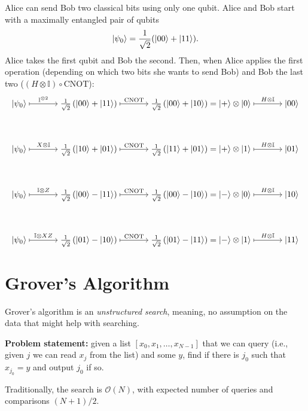 \documentclass[12pt]{amsart}
\theoremstyle{plain}
\theoremstyle{definition}
\theoremstyle{remark}
\newcommand{\mcal}{\mathcal}
\newcommand{\cnot}{\mathrm{CNOT}}  %
\newcommand{\idt}{\mathbb{I}}
\begin{document}
Alice can send Bob two classical bits using only one qubit.  Alice and Bob start with a maximally entangled pair of qubits
\[
  \ket{\psi_0} = \frac{1}{\sqrt2}(\ket{00} + \ket{11}).
\]
Alice takes the first qubit and Bob the second.  Then, when Alice applies the first operation (depending on which two bits she wants to send Bob) and Bob the last two ($(H \otimes \idt) \circ \cnot$):
\[
  \begin{tikzcd}[cramped, sep=8ex]
    \ket{\psi_0} \arrow[r, mapsto, "\idt^{\otimes 2}"] & \frac{1}{\sqrt{2}} \left( \ket{00} + \ket{11} \right) \arrow[r, mapsto, "\cnot"] &  \frac{1}{\sqrt{2}} \left( \ket{00} + \ket{10} \right) = \ket{+} \otimes \ket{0} \arrow[r, mapsto, "H \otimes \idt"] & \ket{00} \\
    \ket{\psi_0} \arrow[r, mapsto, "X \otimes \idt"] & \frac{1}{\sqrt{2}} \left( \ket{10} + \ket{01} \right) \arrow[r, mapsto, "\cnot"] &  \frac{1}{\sqrt{2}} \left( \ket{11} + \ket{01} \right) = \ket{+} \otimes \ket{1} \arrow[r, mapsto, "H \otimes \idt"]  & \ket{01}\\
    \ket{\psi_0} \arrow[r, mapsto, "\idt \otimes Z"] & \frac{1}{\sqrt{2}} \left( \ket{00} - \ket{11} \right) \arrow[r, mapsto, "\cnot"] &  \frac{1}{\sqrt{2}} \left( \ket{00} - \ket{10} \right) = \ket{-} \otimes \ket{0} \arrow[r, mapsto, "H \otimes \idt"]  & \ket{10}\\
    \ket{\psi_0} \arrow[r, mapsto, "\idt \otimes XZ"] & \frac{1}{\sqrt{2}} \left( \ket{01} - \ket{10} \right) \arrow[r, mapsto, "\cnot"] &  \frac{1}{\sqrt{2}} \left( \ket{01} - \ket{11} \right) = \ket{-} \otimes \ket{1} \arrow[r, mapsto, "H \otimes \idt"]  & \ket{11}
  \end{tikzcd}
\]




\section{Grover's Algorithm}

Grover's algorithm is an \emph{unstructured search}, meaning, no assumption on the data that might help with searching.


\textbf{Problem statement:} given a list $[x_0, x_1, \ldots , x_{N-1}]$ that we can query (i.e., given $j$ we can read $x_j$ from the list) and some $y$, find if there is $j_0$ such that $x_{j_0} = y$ and output $j_0$ if so.

Traditionally, the search is $\mcal{O}(N)$, with expected number of queries and comparisons $(N + 1)/2$.
\end{document}
